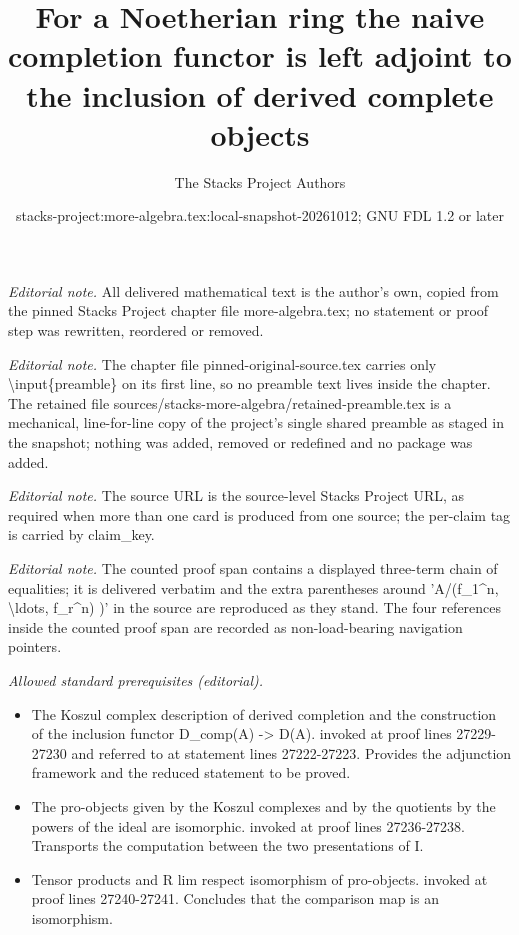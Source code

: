 \documentclass[10pt,a4paper]{amsart}
\title{For a Noetherian ring the naive completion functor is left adjoint to the inclusion of derived complete objects}
\author{The Stacks Project Authors}
\date{stacks-project:more-algebra.tex:local-snapshot-20261012; GNU FDL 1.2 or later}
\theoremstyle{plain}
\theoremstyle{definition}
\theoremstyle{remark}
\numberwithin{equation}{subsection}
\begin{document}
\maketitle
\setcounter{subsection}{1}
\noindent\textit{Editorial note.} All delivered mathematical text is the author's own, copied from the pinned Stacks Project chapter file more-algebra.tex; no statement or proof step was rewritten, reordered or removed.\par\medskip
\noindent\textit{Editorial note.} The chapter file pinned-original-source.tex carries only \textbackslash{}input\{preamble\} on its first line, so no preamble text lives inside the chapter. The retained file sources/stacks-more-algebra/retained-preamble.tex is a mechanical, line-for-line copy of the project's single shared preamble as staged in the snapshot; nothing was added, removed or redefined and no package was added.\par\medskip
\noindent\textit{Editorial note.} The source URL is the source-level Stacks Project URL, as required when more than one card is produced from one source; the per-claim tag is carried by claim\_key.\par\medskip
\noindent\textit{Editorial note.} The counted proof span contains a displayed three-term chain of equalities; it is delivered verbatim and the extra parentheses around 'A/(f\_1\textasciicircum{}n, \textbackslash{}ldots, f\_r\textasciicircum{}n) )' in the source are reproduced as they stand. The four references inside the counted proof span are recorded as non-load-bearing navigation pointers.\par\medskip
\noindent\textit{Allowed standard prerequisites (editorial).}\begin{itemize}
\item The Koszul complex description of derived completion and the construction of the inclusion functor D\_comp(A) -> D(A). invoked at proof lines 27229-27230 and referred to at statement lines 27222-27223. Provides the adjunction framework and the reduced statement to be proved.
\item The pro-objects given by the Koszul complexes and by the quotients by the powers of the ideal are isomorphic. invoked at proof lines 27236-27238. Transports the computation between the two presentations of I.
\item Tensor products and R lim respect isomorphism of pro-objects. invoked at proof lines 27240-27241. Concludes that the comparison map is an isomorphism.
\end{itemize}\medskip
\end{document}
